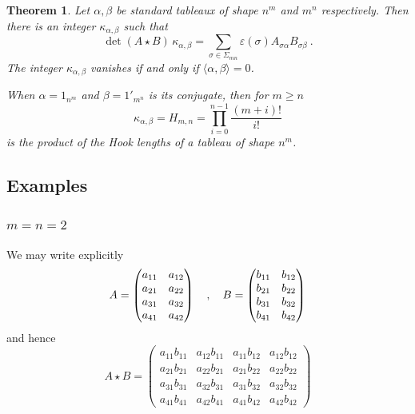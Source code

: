 \documentclass[10pt]{amsart}
\newtheorem{thm}{Theorem}[section]
\theoremstyle{definition}
\theoremstyle{remark}
\numberwithin{equation}{section}
\newcommand{\lf}{\langle}
\newcommand{\rf}{\rangle}
\newcommand{\0}{\color{blue}{\mathsf{0}}}
\begin{document}
\begin{thm}  \label{thm: detABSymmetric}  Let  $\alpha,\beta$ be  standard tableaux of shape $n^m$ and $m^n$ respectively.
Then there is an integer $\kappa_{\alpha,\beta}$ such that  
\[ \det(A\star B)  \, \kappa_{\alpha, \beta}  =    \sum_{\sigma\in \Sigma_{mn}} \varepsilon(\sigma) A_{\sigma\alpha} B_{\sigma \beta} \ . \]
The integer $\kappa_{\alpha,\beta}$ vanishes if and only if $\lf \alpha, \beta\rf =0$. 


When  $\alpha=1_{n^m}$ and $\beta=1'_{m^n}$ is its conjugate, then for $m\geq n$ 
\[\kappa_{\alpha,\beta} =  H_{m,n} =   \prod_{i=0}^{n-1}  \frac{(m+i)!}{i!}  \] is the product of the Hook lengths of a tableau of shape $n^m$.
\end{thm} 






\subsection{Examples}

\subsubsection{$m=n=2$}We may write explicitly 
\[ A= \begin{pmatrix}
a_{11}   &   a_{12}      \\ 
a_{21}   &   a_{22}      \\
a_{31}  &   a_{32}     \\
a_{41}   &   a_{42}    
\end{pmatrix} 
\\  \quad , \quad B= \begin{pmatrix}
b_{11}  &    b_{12}    \\ 
b_{21}  &    b_{22}     \\
b_{31}  &     b_{32}    \\
b_{41}  &     b_{42}    
\end{pmatrix} 
\]
and hence
\[ A\star B = 
\begin{pmatrix}
a_{11}b_{11}  &   a_{12} b_{11}  & a_{11}b_{12}  &   a_{12} b_{12}   \\ 
a_{21}b_{21}  &   a_{22} b_{21}  & a_{21}b_{22}  &   a_{22} b_{22}   \\
a_{31}b_{31}  &   a_{32} b_{31}  & a_{31}b_{32}  &   a_{32} b_{32}    \\
a_{41}b_{41}  &   a_{42} b_{41}  & a_{41}b_{42}  &   a_{42} b_{42}    
\end{pmatrix} 
 \]
\end{document}
